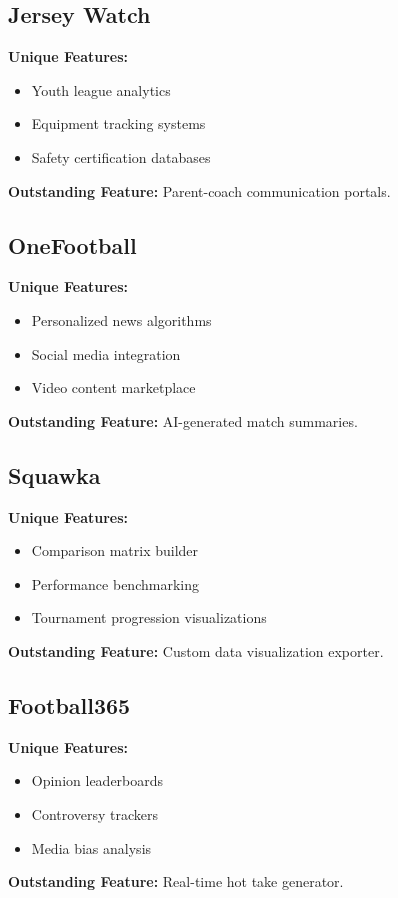 \subsection{Jersey Watch}
\textbf{Unique Features:}
\begin{itemize}
    \item Youth league analytics
    \item Equipment tracking systems
    \item Safety certification databases
\end{itemize}
\textbf{Outstanding Feature:} Parent-coach communication portals\parencite{jerseywatch}.

\subsection{OneFootball}
\textbf{Unique Features:}
\begin{itemize}
    \item Personalized news algorithms
    \item Social media integration
    \item Video content marketplace
\end{itemize}
\textbf{Outstanding Feature:} AI-generated match summaries\parencite{onefootball}.

\subsection{Squawka}
\textbf{Unique Features:}
\begin{itemize}
    \item Comparison matrix builder
    \item Performance benchmarking
    \item Tournament progression visualizations
\end{itemize}
\textbf{Outstanding Feature:} Custom data visualization exporter\parencite{squawka}.

\subsection{Football365}
\textbf{Unique Features:}
\begin{itemize}
    \item Opinion leaderboards
    \item Controversy trackers
    \item Media bias analysis
\end{itemize}
\textbf{Outstanding Feature:} Real-time hot take generator\parencite{f365}.

